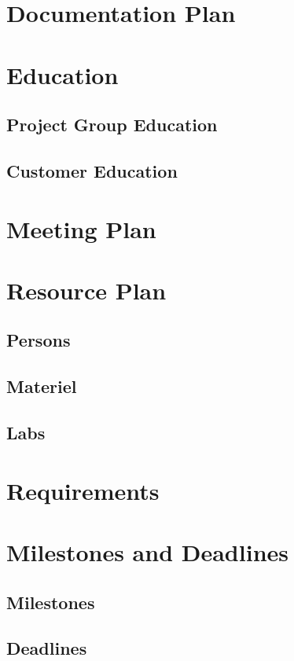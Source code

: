 \documentclass[a4paper,12pt]{article}
\begin{document}
\section{Documentation Plan}	

\section{Education}	
\subsection{Project Group Education}
\subsection{Customer Education}

\section{Meeting Plan}

\section{Resource Plan}
\subsection{Persons}
\subsection{Materiel}
\subsection{Labs}

\section{Requirements}
\label{requirements}
\section{Milestones and Deadlines}
\subsection{Milestones}
\subsection{Deadlines}
\end{document}
